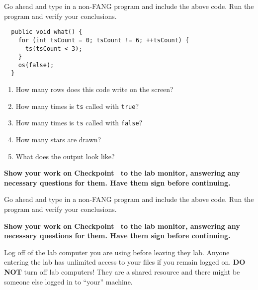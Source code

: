 \documentclass[12pt,oneside]{memoir}
\newcommand\code[1]{\lstinline^#1^}
\newenvironment{Checkpoint}[1]{%
  \begin{Exercise}[name={Checkpoint},title={#1}]}{%
  \end{Exercise}%
  \textbf{Show your work on Checkpoint~\theExercise{} to the lab monitor, %
    answering any necessary questions for them.  Have them sign before continuing.}}
\begin{document}
\begin{Checkpoint}{what}
  Go ahead and type in a non-FANG program and include the above
  code. Run the program and verify your conclusions.

  \begin{lstlisting}
  public void what() {
    for (int tsCount = 0; tsCount != 6; ++tsCount) {
      ts(tsCount < 3);
    }
    os(false);
  }
  \end{lstlisting}

  \begin{enumerate}
  \item How many rows does this code write on the screen?
  \item How many times is \code{ts} called with \code{true}?
  \item How many times is \code{ts} called with \code{false}?
  \item How many stars are drawn?
  \item What does the output look like?
  \end{enumerate}
\end{Checkpoint}

\begin{Checkpoint}{}
  Go ahead and type in a non-FANG program and include the above
  code. Run the program and verify your conclusions.
\end{Checkpoint}


\Large{Log off of the lab computer you are using before leaving they
  lab. Anyone entering the lab has unlimited access to your files if
  you remain logged on. \textbf{DO NOT} turn off lab computers! They
  are a shared resource and there might be someone else logged in to
  ``your'' machine.}
\end{document}
